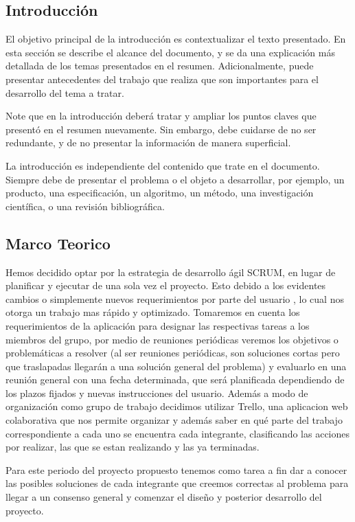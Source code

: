 \documentclass[twocolumn,11pts]{IEEEtran}
\begin{document}
\subsection{Introducción}
El objetivo principal de la introducción es contextualizar el texto presentado. En esta sección se describe el alcance del documento, y se da una explicación más detallada de los temas presentados en el resumen. Adicionalmente, puede presentar antecedentes del trabajo que realiza que son importantes para el desarrollo del tema a tratar.

Note que en la introducción deberá tratar y ampliar los puntos claves que presentó en el resumen nuevamente. Sin embargo, debe cuidarse de no ser redundante, y de no presentar la información de manera superficial.

La introducción es independiente del contenido que trate en el documento. Siempre debe de presentar el problema o el objeto a desarrollar, por ejemplo, un producto, una especificación, un algoritmo, un método, una investigación científica, o una revisión bibliográfica.
\subsection{Marco Teorico}
Hemos decidido optar por la estrategia de desarrollo ágil SCRUM, en lugar de planificar y ejecutar de una sola vez el proyecto. Esto debido a los evidentes cambios o simplemente nuevos requerimientos por parte del usuario , lo cual nos otorga un trabajo mas rápido y optimizado.
Tomaremos en cuenta los requerimientos de la aplicación para designar las respectivas tareas a los miembros del grupo, por medio de reuniones periódicas veremos los objetivos o problemáticas a resolver (al ser reuniones periódicas, son soluciones cortas pero que traslapadas llegarán a una solución general del problema) y evaluarlo en una reunión general con una fecha determinada, que será planificada dependiendo de los plazos fijados y nuevas instrucciones del usuario.
Además a modo de organización como grupo de trabajo decidimos utilizar Trello, una aplicacion web colaborativa que nos permite organizar y además saber en qué parte del trabajo
correspondiente a cada uno se encuentra cada integrante, clasificando las acciones por realizar, las que se estan realizando y las ya terminadas.

Para este periodo del proyecto propuesto tenemos como tarea a fin dar a conocer las posibles soluciones de cada integrante que creemos correctas al problema para llegar a un consenso general y comenzar el diseño y posterior desarrollo del proyecto.
\end{document}
